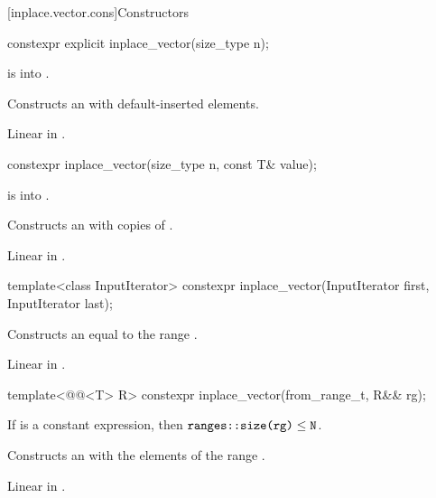 [inplace.vector.cons]{Constructors}

\begin{itemdecl}
constexpr explicit inplace_vector(size_type n);
\end{itemdecl}

\begin{itemdescr}
\pnum
\expects
{} is  into .

\pnum
\effects
Constructs an  with  default-inserted elements.

\pnum
\complexity
Linear in .
\end{itemdescr}

\begin{itemdecl}
constexpr inplace_vector(size_type n, const T& value);
\end{itemdecl}

\begin{itemdescr}
\pnum
\expects
{} is  into .

\pnum
\effects
Constructs an  with  copies of .

\pnum
\complexity
Linear in .
\end{itemdescr}

\begin{itemdecl}
template<class InputIterator>
  constexpr inplace_vector(InputIterator first, InputIterator last);
\end{itemdecl}

\begin{itemdescr}
\pnum
\effects
Constructs an  equal to the range .

\pnum
\complexity
Linear in .
\end{itemdescr}

\begin{itemdecl}
template<@@<T> R>
  constexpr inplace_vector(from_range_t, R&& rg);
\end{itemdecl}

\begin{itemdescr}
\pnum
\mandates
If  is a constant expression,
then $\tcode{ranges::size(rg)} \le \tcode{N}$.

\pnum
\effects
Constructs an  with
the elements of the range .

\pnum
\complexity
Linear in .
\end{itemdescr}

